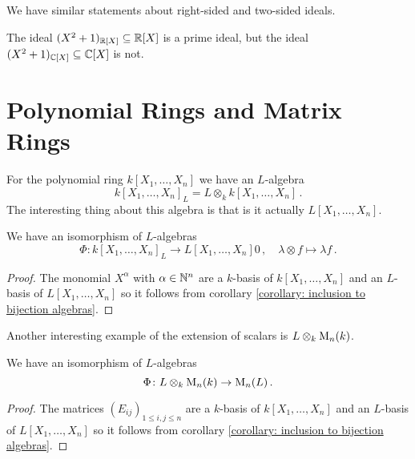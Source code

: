 \begin{remark}
  We have similar statements about right-sided and two-sided ideals.
\end{remark}


\begin{warning}
  The ideal $(X^2+1)_{\mathbb{R}[X]} \subseteq \mathbb{R}[X]$ is a prime ideal, but the ideal \mbox{$(X^2+1)_{\mathbb{C}[X]} \subseteq \mathbb{C}[X]$} is not.
\end{warning}





\section{Polynomial Rings and Matrix Rings}


For the polynomial ring $k[X_1, \dotsc, X_n]$ we have an $L$-algebra
\[
    k[X_1, \dotsc, X_n]_L
  = L \otimes_k k[X_1, \dotsc, X_n] \,.
\]
The interesting thing about this algebra is that is it actually $L[X_1, \dotsc, X_n]$.


\begin{proposition}
  We have an isomorphism of $L$-algebras
  \[
            \Phi
    \colon  k[X_1, \dotsc, X_n]_L
    \to     L[X_1, \dotsc, X_n]0\,,
    \quad   \lambda \otimes f
    \mapsto \lambda f \,.
  \]
\end{proposition}
\begin{proof}
  The monomial $X^\alpha$ with $\alpha \in \mathbb{N}^n$ are a $k$-basis of $k[X_1, \dotsc, X_n]$ and an $L$-basis of $L[X_1, \dotsc, X_n]$ so it follows from corollary \ref{corollary: inclusion to bijection algebras}.
\end{proof}


Another interesting example of the extension of scalars is $L \otimes_k \operatorname{M}_n(k)$.


\begin{proposition}
  We have an isomorphism of $L$-algebras
  \[
    \Phi \colon L \otimes_k \operatorname{M}_n(k) \to \operatorname{M}_n(L) \,.
  \]
\end{proposition}
\begin{proof}
  The matrices $(E_{ij})_{1 \leq i,j \leq n}$ are a $k$-basis of $k[X_1, \dotsc, X_n]$ and an $L$-basis of $L[X_1, \dotsc, X_n]$ so it follows from corollary \ref{corollary: inclusion to bijection algebras}.
\end{proof}




